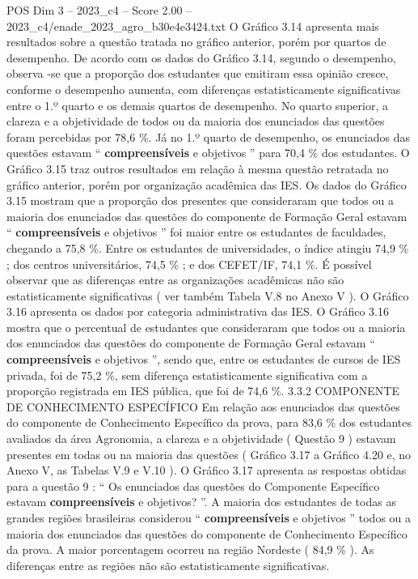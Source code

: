 \begin{textsample}{POS Dim 3 – 2023\_c4 – Score 2.00 – 2023\_c4/enade\_2023\_agro\_b30e4e3424.txt}
O Gráfico 3.14 apresenta mais resultados sobre a questão tratada no gráfico anterior, porém por quartos de desempenho.
De acordo com os dados do Gráfico 3.14, segundo o desempenho, observa -se que a proporção dos estudantes que emitiram essa opinião cresce, conforme o desempenho aumenta, com diferenças estatisticamente significativas entre o 1.º quarto e os demais quartos de desempenho.
No quarto superior, a clareza e a objetividade de todos ou da maioria dos enunciados das questões foram percebidas por 78,6 \%.
Já no 1.º quarto de desempenho, os enunciados das questões estavam “ \textbf{compreensíveis} e objetivos ” para 70,4 \% dos estudantes.
O Gráfico 3.15 traz outros resultados em relação à mesma questão retratada no gráfico anterior, porém por organização acadêmica das IES.
Os dados do Gráfico 3.15 mostram que a proporção dos presentes que consideraram que todos ou a maioria dos enunciados das questões do componente de Formação Geral estavam “ \textbf{compreensíveis} e objetivos ” foi maior entre os estudantes de faculdades, chegando a 75,8 \%.
Entre os estudantes de universidades, o índice atingiu 74,9 \% ; dos centros universitários, 74,5 \% ; e dos CEFET/IF, 74,1 \%.
É possível observar que as diferenças entre as organizações acadêmicas não são estatisticamente significativas ( ver também Tabela V.8 no Anexo V ).
O Gráfico 3.16 apresenta os dados por categoria administrativa das IES.
O Gráfico 3.16 mostra que o percentual de estudantes que consideraram que todos ou a maioria dos enunciados das questões do componente de Formação Geral estavam “ \textbf{compreensíveis} e objetivos ”, sendo que, entre os estudantes de cursos de IES privada, foi de 75,2 \%, sem diferença estatisticamente significativa com a proporção registrada em IES pública, que foi de 74,6 \%. 3.3.2 COMPONENTE DE CONHECIMENTO ESPECÍFICO Em relação aos enunciados das questões do componente de Conhecimento Específico da prova, para 83,6 \% dos estudantes avaliados da área Agronomia, a clareza e a objetividade ( Questão 9 ) estavam presentes em todas ou na maioria das questões ( Gráfico 3.17 a Gráfico 4.20 e, no Anexo V, as Tabelas V.9 e V.10 ).
O Gráfico 3.17 apresenta as respostas obtidas para a questão 9 : “ Os enunciados das questões do Componente Específico estavam \textbf{compreensíveis} e objetivos? ”.
A maioria dos estudantes de todas as grandes regiões brasileiras considerou “ \textbf{compreensíveis} e objetivos ” todos ou a maioria dos enunciados das questões do componente de Conhecimento Específico da prova.
A maior porcentagem ocorreu na região Nordeste ( 84,9 \% ).
As diferenças entre as regiões não são estatisticamente significativas.

\end{textsample}
